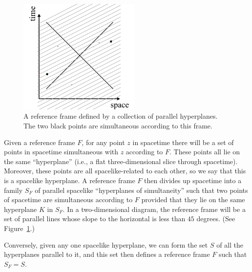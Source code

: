 \begin{figure}\label{fig:simultaneity}
\includegraphics[width=6cm]{simultaneity.pdf}
\caption{A reference frame defined by a collection of parallel hyperplanes. The two black points are simultaneous
according to this frame.}
\end{figure}
Given a reference frame $F$, for any point $z$ in spacetime there will be a set of points in spacetime simultaneous 
with $z$ according to $F$. These points all lie on the same ``hyperplane'' (i.e., a flat three-dimensional slice 
through spacetime). Moreover, these points are all spacelike-related to each other, so we say that this is a 
spacelike hyperplane. A reference frame $F$ then divides up spacetime into a family $S_F$ of parallel spacelike 
``hyperplanes of simultaneity'' such that two points of spacetime are simultaneous according to $F$ provided that they lie on the 
same hyperplane $K$ in $S_F$. In a two-dimensional diagram, the reference frame will be a set of parallel lines
whose slope to the horizontal is less than $45$ degrees. (See Figure~\ref{fig:simultaneity}.)

Conversely, given any one spacelike hyperplane, we can form the set $S$ of all the hyperplanes parallel to it, and this 
set then defines a reference frame $F$ such that $S_F=S$.

